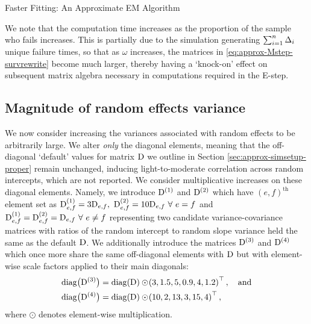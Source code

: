 \begin{chapter}{\label{cha:approx}Faster Fitting: An Approximate EM Algorithm}
  \begin{remark}
      We note that the computation time increases as the proportion of the sample who fails increases. This is partially due to the simulation generating $\sum_{i=1}^n\Delta_i$ unique failure times, so that as $\omega$ increases, the matrices in \eqref{eq:approx-Mstep-survrewrite} become much larger, thereby having a `knock-on' effect on subsequent matrix algebra necessary in computations required in the E-step.
  \end{remark}
  
  \subsection{Magnitude of random effects variance}\label{sec:approx-sims-D}
  We now consider increasing the variances associated with random effects to be arbitrarily large. We alter \textit{only} the diagonal elements, meaning that the off-diagonal `default' values for matrix $\mathrm{D}$ we outline in Section \ref{sec:approx-simsetup-proper} remain unchanged, inducing light-to-moderate correlation across random intercepts, which are not reported. We consider multiplicative increases on these diagonal elements. Namely, we introduce $\mathrm{D}^{(1)}$ and $\mathrm{D}^{(2)}$ which have $(e,f)^{\mathrm{th}}$ element set as $\D^{(1)}_{e,f}=3\D_{e,f},\ \D^{(2)}_{e,f}=10\D_{e,f}\ \forall\ e=f$ and $\D^{(1)}_{e,f}=\D^{(2)}_{e,f}=\D_{e,f}\ \forall\ e\neq f$ representing two candidate variance-covariance matrices with ratios of the random intercept to random slope variance held the same as the default $\mathrm{D}$. We additionally introduce the matrices $\mathrm{D}^{(3)}$ and $\mathrm{D}^{(4)}$ which once more share the same off-diagonal elements with $\mathrm{D}$ but with element-wise scale factors applied to their main diagonals:
  \begin{align*}
      \mathrm{diag}\big(\mathrm{D}^{(3)}\big)&=\mathrm{diag}\!\left(\mathrm{D}\right)\odot\!\left(3,1.5,5,0.9,4,1.2\right)^\top,\quad\mathrm{and}\\
      \mathrm{diag}\big(\mathrm{D}^{(4)}\big)&=\mathrm{diag}\!\left(\mathrm{D}\right)\odot\!\left(10,2,13,3,15,4\right)^\top,
  \end{align*}
  where $\odot$ denotes element-wise multiplication.
  

\end{chapter}
